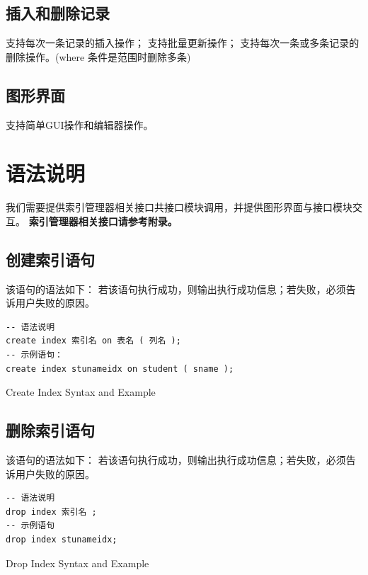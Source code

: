 \documentclass[UTF8]{ctexrep} %
\newenvironment{longlisting}{\captionsetup{type=listing}}{}
\begin{document}
\subsection{插入和删除记录}
支持每次一条记录的插入操作；
支持批量更新操作；
支持每次一条或多条记录的删除操作。(where 条件是范围时删除多条)
\subsection{图形界面}
支持简单GUI操作和编辑器操作。

\section{语法说明}
我们需要提供索引管理器相关接口共接口模块调用，并提供图形界面与接口模块交互。
\textbf{索引管理器相关接口请参考附录。}


\subsection{创建索引语句}
该语句的语法如下：
若该语句执行成功，则输出执行成功信息；若失败，必须告诉用户失败的原因。
\begin{longlisting}
    \begin{verbatim}
-- 语法说明
create index 索引名 on 表名 ( 列名 );
-- 示例语句：
create index stunameidx on student ( sname );
    \end{verbatim}
    \caption{Create Index Syntax and Example}
    \label{lst:create_index_requirements}
\end{longlisting}

\subsection{删除索引语句}
该语句的语法如下：
若该语句执行成功，则输出执行成功信息；若失败，必须告诉用户失败的原因。
\begin{longlisting}
    \begin{verbatim}
-- 语法说明
drop index 索引名 ;
-- 示例语句
drop index stunameidx;
    \end{verbatim}
    \caption{Drop Index Syntax and Example}
    \label{lst:drop_index_requirements}
\end{longlisting}
\end{document}
